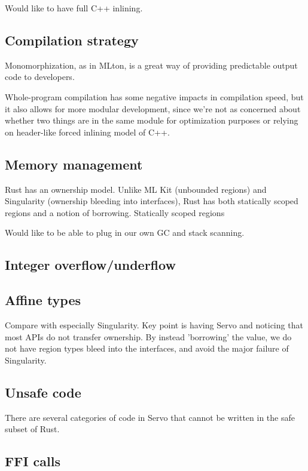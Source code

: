 Would like to have full C++ inlining.

\subsection{Compilation strategy}
Monomorphization, as in MLton, is a great way of providing predictable output code to developers.

Whole-program compilation has some negative impacts in compilation speed, but it also allows for more modular development, since we're not as concerned about whether two things are in the same module for optimization purposes or relying on header-like forced inlining model of C++.

\subsection{Memory management}
Rust has an ownership model.
Unlike ML Kit (unbounded regions) and Singularity (ownership bleeding into interfaces), Rust has both statically scoped regions and a notion of borrowing.
Statically scoped regions


Would like to be able to plug in our own GC and stack scanning.


\subsection{Integer overflow/underflow}

\subsection{Affine types}
\label{sec:affine}

Compare with especially Singularity. Key point is having Servo and noticing that most APIs do not transfer ownership. By instead 'borrowing' the value, we do not have region types bleed into the interfaces, and avoid the major failure of Singularity.

\subsection{Unsafe code}
\label{sec:safety}

There are several categories of code in Servo that cannot be written in the safe subset of Rust.

\subsection{FFI calls}


